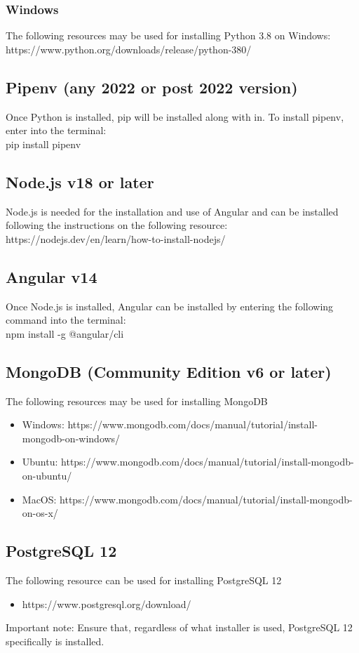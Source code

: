 \documentclass{article}
\begin{document}
\subsubsection{Windows}
The following resources may be used for installing Python 3.8 on Windows:
https://www.python.org/downloads/release/python-380/

\subsection{Pipenv (any 2022 or post 2022 version)}
Once Python is installed, pip will be installed along with in. To install pipenv, enter into the terminal:\\
pip install pipenv

\subsection{Node.js v18 or later}
Node.js is needed for the installation and use of Angular and can be installed
following the instructions on the following resource:\\
https://nodejs.dev/en/learn/how-to-install-nodejs/

\subsection{Angular v14}
Once Node.js is installed, Angular can be installed by entering the following command into the terminal:\\
npm install -g @angular/cli

\subsection{MongoDB (Community Edition v6 or later)}
The following resources may be used for installing MongoDB
\begin{itemize}
    \item Windows: https://www.mongodb.com/docs/manual/tutorial/install-mongodb-on-windows/
    \item Ubuntu: https://www.mongodb.com/docs/manual/tutorial/install-mongodb-on-ubuntu/
    \item MacOS: https://www.mongodb.com/docs/manual/tutorial/install-mongodb-on-os-x/
\end{itemize}

\subsection{PostgreSQL 12}
The following resource can be used for installing PostgreSQL 12
\begin{itemize}
    \item https://www.postgresql.org/download/
\end{itemize}
Important note: Ensure that, regardless of what installer is used, PostgreSQL 12 specifically is installed.
\end{document}

